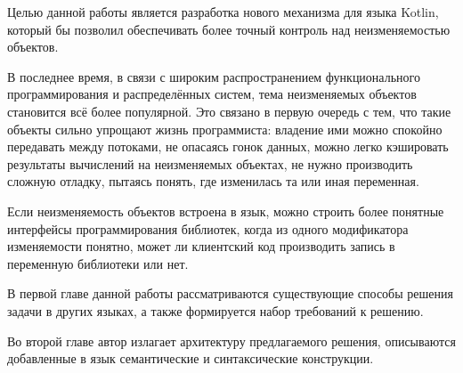 \documentclass[specification,annotation,times]{itmo-student-thesis}
\begin{document}





\tableofcontents

\startprefacepage

Целью данной работы является разработка нового механизма для языка Kotlin, который бы позволил обеспечивать более точный контроль над неизменяемостью объектов.

В последнее время, в связи с широким распространением функционального программирования и распределённых систем, тема неизменяемых объектов становится всё более популярной.
Это связано в первую очередь с тем, что такие объекты сильно упрощают жизнь программиста: владение ими можно спокойно передавать между потоками, не опасаясь гонок данных, можно легко кэшировать результаты вычислений на неизменяемых объектах, не нужно производить сложную отладку, пытаясь понять, где изменилась та или иная переменная.

Если неизменяемость объектов встроена в язык, можно строить более понятные интерфейсы программирования библиотек, когда из одного модификатора изменяемости понятно, может ли клиентский код производить запись в переменную библиотеки или нет.

В первой главе данной работы рассматриваются существующие способы решения задачи в других языках, а также формируется набор требований к решению.

Во второй главе автор излагает архитектуру предлагаемого решения, описываются добавленные в язык семантические и синтаксические конструкции.
\end{document}
